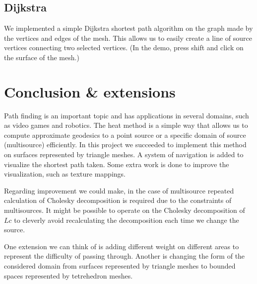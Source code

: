 \documentclass[a4paper,12pt,twoside]{article}
\begin{document}

\subsection{Dijkstra}
We implemented a simple Dijkstra shortest path algorithm on the graph made by the vertices and edges of the mesh. This allows us to easily create a line of source vertices connecting two selected vertices. (In the demo, press shift and click on the surface of the mesh.)


\section{Conclusion \& extensions}
Path finding is an important topic and has applications in several domains, such as video games and robotics. The heat method is a simple way that allows us to compute approximate geodesics to a point source or a specific domain of source (multisource) efficiently. In this project we succeeded to implement this method on surfaces represented by triangle meshes. A system of navigation is added to visualize the shortest path taken. Some extra work is done to improve the visualization, such as texture mappings.

Regarding improvement we could make, in the case of multisource repeated calculation of Cholesky decomposition is required due to the constraints of multisources. It might be possible to operate on the Cholesky decomposition of $Lc$ to cleverly avoid recalculating the decomposition each time we change the source.

One extension we can think of is adding different weight on different areas to represent the difficulty of passing through. Another is changing the form of the considered domain from surfaces represented by triangle meshes to bounded spaces represented by tetrehedron meshes.
\end{document}

